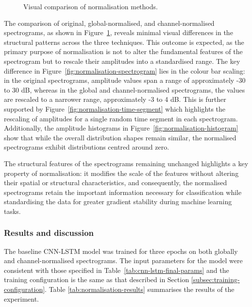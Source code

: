 \begin{figure}[p]
    \caption{Visual comparison of normalisation methods.}
    \label{fig:normalisation-combined}
\end{figure}

The comparison of original, global-normalised, and channel-normalised spectrograms, as shown in Figure~\ref{fig:normalisation-combined}, reveals minimal visual differences in the structural patterns across the three techniques. This outcome is expected, as the primary purpose of normalisation is not to alter the fundamental features of the spectrogram but to rescale their amplitudes into a standardised range. The key difference in Figure~\ref{fig:normalisation-spectrogram} lies in the colour bar scaling: in the original spectrograms, amplitude values span a range of approximately -30 to 30 dB, whereas in the global and channel-normalised spectrograms, the values are rescaled to a narrower range, approximately -3 to 4 dB. This is further supported by Figure~\ref{fig:normalisation-time-segment} which highlights the rescaling of amplitudes for a single random time segment in each spectrogram. Additionally, the amplitude histograms in Figure~\ref{fig:normalisation-histogram} show that while the overall distribution shapes remain similar, the normalised spectrograms exhibit distributions centred around zero. 

The structural features of the spectrograms remaining unchanged highlights a key property of normalisation: it modifies the scale of the features without altering their spatial or structural characteristics, and consequently, the normalised spectrograms retain the important information necessary for classification while standardising the data for greater gradient stability during machine learning tasks.

\subsubsection{Results and discussion}

The baseline CNN-LSTM model was trained for three epochs on both globally and channel-normalised spectrograms. The input parameters for the model were consistent with those specified in Table~\ref{tab:cnn-lstm-final-params} and the training configuration is the same as that described in Section \ref{subsec:training-configuration}. Table \ref{tab:normalisation-results} summarises the results of the experiment. 

